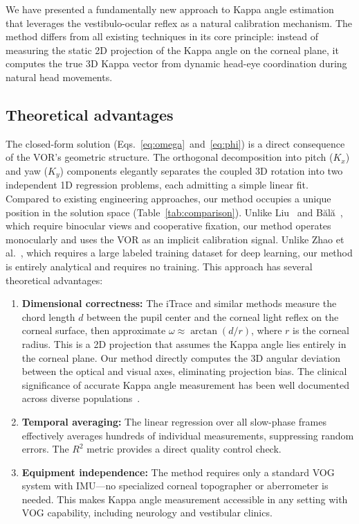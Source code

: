 \documentclass[review,numbers,sort&compress]{elsarticle}
\begin{document}
We have presented a fundamentally new approach to Kappa angle estimation that leverages the vestibulo-ocular reflex as a natural calibration mechanism. The method differs from all existing techniques in its core principle: instead of measuring the static 2D projection of the Kappa angle on the corneal plane, it computes the true 3D Kappa vector from dynamic head-eye coordination during natural head movements.

\subsection{Theoretical advantages}

The closed-form solution (Eqs.~\ref{eq:omega}~and~\ref{eq:phi}) is a direct consequence of the VOR's geometric structure. The orthogonal decomposition into pitch ($K_x$) and yaw ($K_y$) components elegantly separates the coupled 3D rotation into two independent 1D regression problems, each admitting a simple linear fit. Compared to existing engineering approaches, our method occupies a unique position in the solution space (Table~\ref{tab:comparison}). Unlike Liu~\cite{Liu2023} and B\u{a}l\u{a}~\cite{Bala2012}, which require binocular views and cooperative fixation, our method operates monocularly and uses the VOR as an implicit calibration signal. Unlike Zhao et al.~\cite{CVPRW2023}, which requires a large labeled training dataset for deep learning, our method is entirely analytical and requires no training. This approach has several theoretical advantages:

\begin{enumerate}
    \item \textbf{Dimensional correctness:} The iTrace and similar methods measure the chord length $d$ between the pupil center and the corneal light reflex on the corneal surface, then approximate $\omega \approx \arctan(d / r)$, where $r$ is the corneal radius. This is a 2D projection that assumes the Kappa angle lies entirely in the corneal plane. Our method directly computes the 3D angular deviation between the optical and visual axes, eliminating projection bias. The clinical significance of accurate Kappa angle measurement has been well documented across diverse populations~\cite{Ebenholtz2001,Lee2017}.
    \item \textbf{Temporal averaging:} The linear regression over all slow-phase frames effectively averages hundreds of individual measurements, suppressing random errors. The $R^2$ metric provides a direct quality control check.
    \item \textbf{Equipment independence:} The method requires only a standard VOG system with IMU---no specialized corneal topographer or aberrometer is needed. This makes Kappa angle measurement accessible in any setting with VOG capability, including neurology and vestibular clinics.
\end{enumerate}
\end{document}
